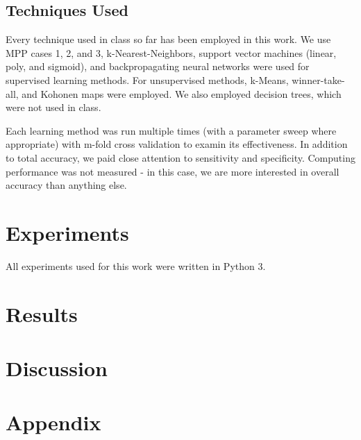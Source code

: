 \documentclass[letter,11pt,titlepage]{article}
\begin{document}
\subsection{Techniques Used}

Every technique used in class so far has been employed in this work. We use MPP cases 1, 2, and 3, k-Nearest-Neighbors, support vector machines (linear, poly, and sigmoid), and backpropagating neural networks were used for supervised learning methods. For unsupervised methods, k-Means, winner-take-all, and Kohonen maps were employed. We also employed decision trees, which were not used in class.

Each learning method was run multiple times (with a parameter sweep where appropriate) with m-fold cross validation to examin its effectiveness. In addition to total accuracy, we paid close attention to sensitivity and specificity. Computing performance was not measured - in this case, we are more interested in overall accuracy than anything else.

\section{Experiments}

All experiments used for this work were written in Python 3. 

\section{Results}

\section{Discussion}

\section{Appendix}

\clearpage


\end{document}
